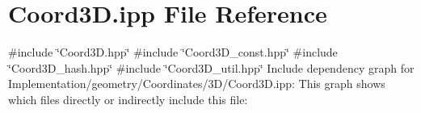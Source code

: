 \hypertarget{Implementation_2geometry_2Coordinates_23D_2Coord3D_8ipp}{}\section{Coord3\+D.\+ipp File Reference}
\label{Implementation_2geometry_2Coordinates_23D_2Coord3D_8ipp}
{\ttfamily \#include \char`\"{}Coord3\+D.\+hpp\char`\"{}}\newline
{\ttfamily \#include \char`\"{}Coord3\+D\+\_\+const.\+hpp\char`\"{}}\newline
{\ttfamily \#include \char`\"{}Coord3\+D\+\_\+hash.\+hpp\char`\"{}}\newline
{\ttfamily \#include \char`\"{}Coord3\+D\+\_\+util.\+hpp\char`\"{}}\newline
Include dependency graph for Implementation/geometry/\+Coordinates/3\+D/\+Coord3D.ipp\+:
This graph shows which files directly or indirectly include this file\+:
